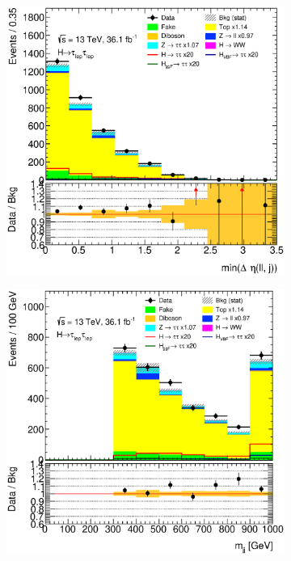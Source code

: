 \begin{figure}[htb]
\begin{subfigure}[t]{0.3\textwidth}
    \end{subfigure}
    \begin{subfigure}[t]{0.3\textwidth}
        \includegraphics[width=\textwidth]{./plots/mva/modeling/input_vars/VBF_CR/ll-CutMVAVBFCatTopCR-MinDEtaDilepJets-lin.eps}
    \end{subfigure}
    \begin{subfigure}[t]{0.3\textwidth}
        \includegraphics[width=\textwidth]{./plots/mva/modeling/input_vars/VBF_CR/ll-CutMVAVBFCatTopCR-Mjj-lin.eps}

\end{subfigure}
\end{figure}
